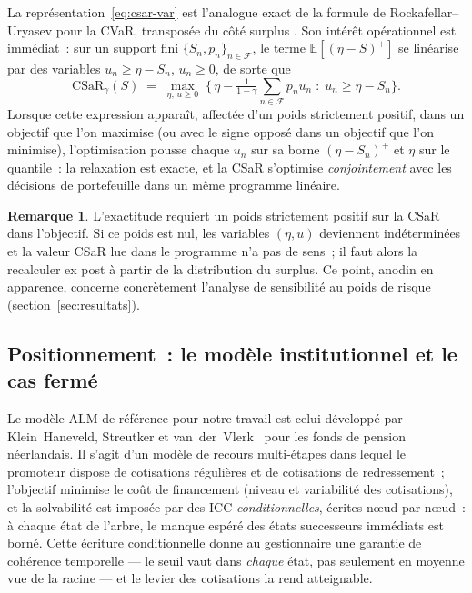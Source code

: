 \documentclass[11pt,letterpaper]{article}
\newcommand{\E}{\mathbb{E}}
\newcommand{\CSaR}{\mathrm{CSaR}}
\newcommand{\pos}[1]{\left(#1\right)^{+}}
\theoremstyle{definition}
\newtheorem{remarque}{Remarque}
\begin{document}
La représentation~\eqref{eq:csar-var} est l'analogue exact de la formule de
Rockafellar--Uryasev pour la CVaR, transposée du côté \og surplus \fg. Son intérêt
opérationnel est immédiat~: sur un support fini $\{S_n, p_n\}_{n \in \mathcal F}$,
le terme $\E[\pos{\eta - S}]$ se linéarise par des variables $u_n \ge \eta - S_n$,
$u_n \ge 0$, de sorte que
\begin{equation}\label{eq:csar-lp}
\CSaR_\gamma(S) \;=\; \max_{\eta,\, u \ge 0}\;
\Big\{\, \eta - \tfrac{1}{1-\gamma} \textstyle\sum_{n \in \mathcal F} p_n u_n
\;:\; u_n \ge \eta - S_n \Big\}.
\end{equation}
Lorsque cette expression apparaît, affectée d'un poids strictement positif, dans un
objectif que l'on maximise (ou avec le signe opposé dans un objectif que l'on
minimise), l'optimisation pousse chaque $u_n$ sur sa borne
$\pos{\eta - S_n}$ et $\eta$ sur le quantile~: la relaxation est exacte, et la CSaR
s'optimise \emph{conjointement} avec les décisions de portefeuille dans un même
programme linéaire.

\begin{remarque}\label{rem:lambda-zero}
L'exactitude requiert un poids strictement positif sur la CSaR dans l'objectif. Si
ce poids est nul, les variables $(\eta, u)$ deviennent indéterminées et la valeur
\og CSaR \fg{} lue dans le programme n'a pas de sens~; il faut alors la recalculer
ex post à partir de la distribution du surplus. Ce point, anodin en apparence,
concerne concrètement l'analyse de sensibilité au poids de risque
(section~\ref{sec:resultats}).
\end{remarque}

\subsection{Positionnement~: le modèle institutionnel et le cas fermé}
\label{ssec:positionnement}

Le modèle ALM de référence pour notre travail est celui développé par
Klein~Haneveld, Streutker et van~der~Vlerk~\cite{KHSV2010} pour les fonds de
pension néerlandais. Il s'agit d'un modèle de recours multi-étapes dans lequel le
promoteur dispose de cotisations régulières et de cotisations de redressement~;
l'objectif minimise le coût de financement (niveau et variabilité des cotisations),
et la solvabilité est imposée par des ICC \emph{conditionnelles}, écrites n\oe ud
par n\oe ud~: à chaque état de l'arbre, le manque espéré des états successeurs
immédiats est borné. Cette écriture conditionnelle donne au gestionnaire une
garantie de cohérence temporelle --- le seuil vaut dans \emph{chaque} état, pas
seulement en moyenne vue de la racine --- et le levier des cotisations la rend
atteignable.
\end{document}
